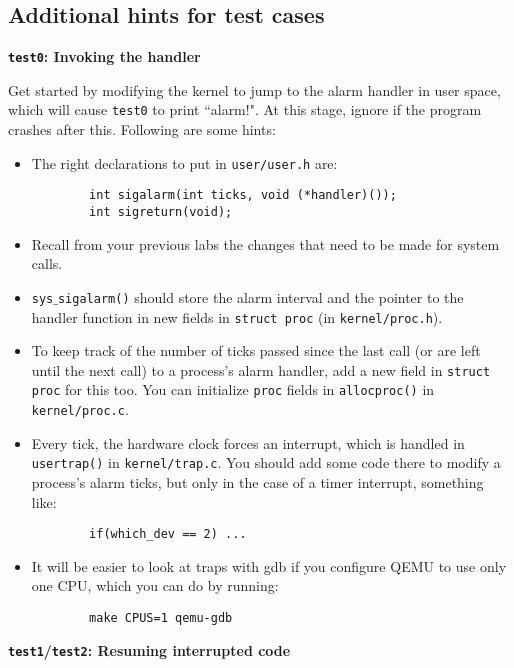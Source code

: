 \documentclass[11pt]{exam}
\begin{document}
\begin{questions}
\subsection{Additional hints for test cases}

{\flushleft \bf \texttt{test0}: Invoking the handler} 

Get started by modifying the kernel to jump to the alarm handler in user space, which will cause \texttt{test0} to print ``alarm!". At this stage, ignore if the program crashes after this. Following are some hints:

\begin{itemize}
    \item The right declarations to put in \texttt{user/user.h} are:\\
    \begin{verbatim}
        int sigalarm(int ticks, void (*handler)());
        int sigreturn(void);
    \end{verbatim}
    \item Recall from your previous labs the changes that need to be made for system calls.
    \item {\tt sys$\_$sigalarm()} should store the alarm interval and the pointer to the handler function in new fields in \texttt{struct proc} (in {\tt kernel/proc.h}). 
    \item To keep track of the number of ticks passed since the last call (or are left until the next call) to a process's alarm handler, add a new field in {\tt struct proc} for this too. You can initialize \texttt{proc} fields in {\tt allocproc()} in {\tt kernel/proc.c}.
    \item Every tick, the hardware clock forces an interrupt, which is handled in {\tt usertrap()} in \texttt{kernel/trap.c}. You should add some code there to modify a process's alarm ticks, but only in the case of a timer interrupt, something like:\\
    \begin{verbatim}
        if(which_dev == 2) ...
    \end{verbatim}
    \item It will be easier to look at traps with gdb if you configure QEMU to use only one CPU, which you can do by running:\\
    \begin{verbatim}
        make CPUS=1 qemu-gdb
    \end{verbatim}
\end{itemize}

{\flushleft \bf \texttt{test1}/\texttt{test2}: Resuming interrupted code}


\end{questions}
\end{document}
